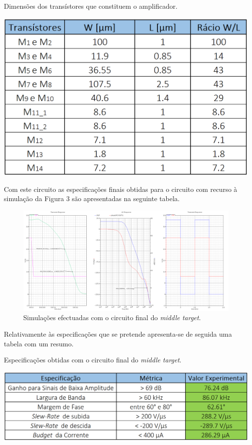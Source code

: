 \documentclass[11pt]{article}
\numberwithin{equation}{section}
\begin{document}
\begin{table}[H]
	\centering
	\caption{Dimensões dos transístores que constituem o amplificador.}
	\vspace{-1.5mm}
	\includegraphics[keepaspectratio=true, scale=0.35]{teoricas/dimensoes1}
\end{table}

Com este circuito as especificações finais obtidas para o circuito com recurso à simulação da Figura 3 são apresentadas na seguinte tabela.

\begin{figure}[H]
	\centering
	\includegraphics[keepaspectratio=true, scale=0.25]{exps/SIngle_Run}
	\vspace{-0.5em}
	\caption{Simulações efectuadas com o circuito final do \textit{middle target}.} 
	\vspace{-0.8em}
\end{figure} 

Relativamente às especificações que se pretende apresenta-se de seguida uma tabela com um resumo.

\begin{table}[H]
	\centering
	\caption{Especificações obtidas com o circuito final do \textit{middle target}.}
	\vspace{-1.5mm}
	\includegraphics[keepaspectratio=true, scale=0.35]{teoricas/specsfinal}
\end{table}
\end{document}
